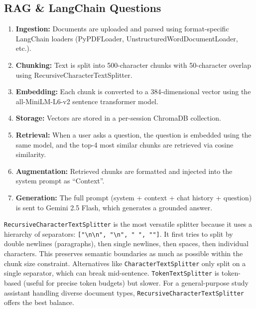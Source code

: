 \documentclass[12pt,a4paper]{article}
\begin{document}
\subsection{RAG \& LangChain Questions}

\begin{interviewbox}
\end{interviewbox}
\begin{answerbox}
\begin{enumerate}
  \item \textbf{Ingestion:} Documents are uploaded and parsed using format-specific LangChain loaders (PyPDFLoader, UnstructuredWordDocumentLoader, etc.).
  \item \textbf{Chunking:} Text is split into 500-character chunks with 50-character overlap using RecursiveCharacterTextSplitter.
  \item \textbf{Embedding:} Each chunk is converted to a 384-dimensional vector using the all-MiniLM-L6-v2 sentence transformer model.
  \item \textbf{Storage:} Vectors are stored in a per-session ChromaDB collection.
  \item \textbf{Retrieval:} When a user asks a question, the question is embedded using the same model, and the top-4 most similar chunks are retrieved via cosine similarity.
  \item \textbf{Augmentation:} Retrieved chunks are formatted and injected into the system prompt as ``Context''.
  \item \textbf{Generation:} The full prompt (system + context + chat history + question) is sent to Gemini 2.5 Flash, which generates a grounded answer.
\end{enumerate}
\end{answerbox}

\begin{interviewbox}
\end{interviewbox}
\begin{answerbox}
\texttt{RecursiveCharacterTextSplitter} is the most versatile splitter because it uses a hierarchy of separators: \texttt{["\textbackslash n\textbackslash n", "\textbackslash n", " ", ""]}. It first tries to split by double newlines (paragraphs), then single newlines, then spaces, then individual characters. This preserves semantic boundaries as much as possible within the chunk size constraint. Alternatives like \texttt{CharacterTextSplitter} only split on a single separator, which can break mid-sentence. \texttt{TokenTextSplitter} is token-based (useful for precise token budgets) but slower. For a general-purpose study assistant handling diverse document types, \texttt{RecursiveCharacterTextSplitter} offers the best balance.
\end{answerbox}
\end{document}
